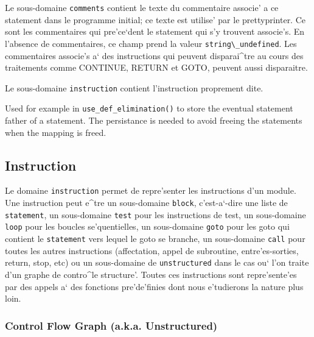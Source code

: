 Le sous-domaine {\tt comments} contient le texte du commentaire associe'
a ce statement dans le programme initial; ce texte est utilise' par le
prettyprinter. Ce sont les commentaires qui pre'ce`dent le statement
qui s'y trouvent associe's. En l'absence de commentaires, ce champ
prend la valeur \verb/string\_undefined/. Les commentaires associe's a`
des instructions qui peuvent disparai^tre au cours des traitements comme
CONTINUE, RETURN et GOTO, peuvent aussi disparaitre.

Le sous-domaine \verb/instruction/ contient
l'instruction proprement dite.

{}

Used for example in \verb/use_def_elimination()/ to store the eventual
statement father of a statement. The persistance is needed to avoid
freeing the statements when the mapping is freed.

\subsection{Instruction}
\label{subsection-instruction}


{ 
Le domaine \verb/instruction/ permet de repre'senter les instructions
d'un module. Une instruction peut e^tre un sous-domaine \verb/block/,
c'est-a`-dire une liste de \verb/statement/, un sous-domaine \verb/test/
pour les instructions de test, un sous-domaine \verb/loop/ pour les
boucles se'quentielles, un sous-domaine \verb/goto/ pour les goto qui
contient le
\verb/statement/ vers lequel le goto se branche, un sous-domaine
\verb/call/ pour toutes les autres instructions (affectation, appel de
subroutine, entre'es-sorties, return, stop, etc) ou un sous-domaine de
\verb/unstructured/ dans le cas ou` l'on traite d'un graphe de contro^le
structure'. Toutes ces instructions 
sont repre'sente'es par des appels a` des fonctions pre'de'finies dont
nous e'tudierons la nature plus loin.
}

\subsubsection{Control Flow Graph (a.k.a. Unstructured)}
\label{subsubsection-unstructured}

